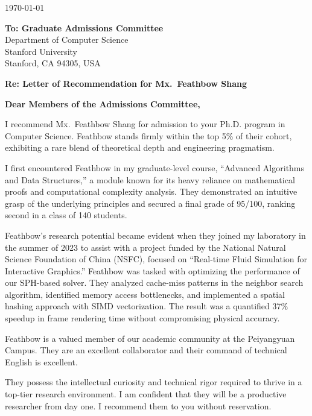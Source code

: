 \documentclass{TJUletter}
\begin{document}
\hfill \today

\vspace{1em}
\noindent
\textbf{To: Graduate Admissions Committee} \\
Department of Computer Science \\
Stanford University \\
Stanford, CA 94305, USA

\vspace{2em}
\textbf{Re: Letter of Recommendation for Mx.~Feathbow Shang}

\vspace{1em}
\textbf{Dear Members of the Admissions Committee,}

I recommend Mx.~Feathbow Shang for admission to your Ph.D. program in Computer Science. Feathbow stands firmly within the top 5\% of their cohort, exhibiting a rare blend of theoretical depth and engineering pragmatism.

I first encountered Feathbow in my graduate-level course, ``Advanced Algorithms and Data Structures,'' a module known for its heavy reliance on mathematical proofs and computational complexity analysis. They demonstrated an intuitive grasp of the underlying principles and secured a final grade of 95/100, ranking second in a class of 140 students.

Feathbow's research potential became evident when they joined my laboratory in the summer of 2023 to assist with a project funded by the National Natural Science Foundation of China (NSFC), focused on ``Real-time Fluid Simulation for Interactive Graphics.'' Feathbow was tasked with optimizing the performance of our SPH-based solver. They analyzed cache-miss patterns in the neighbor search algorithm, identified memory access bottlenecks, and implemented a spatial hashing approach with SIMD vectorization. The result was a quantified 37\% speedup in frame rendering time without compromising physical accuracy.

Feathbow is a valued member of our academic community at the Peiyangyuan Campus. They are an excellent collaborator and their command of technical English is excellent.

They possess the in\-tel\-lec\-tual curiosity and technical rigor required to thrive in a top-tier research environment. I am confident that they will be a productive researcher from day one. I recommend them to you without reservation.

\makeSignature
\end{document}
